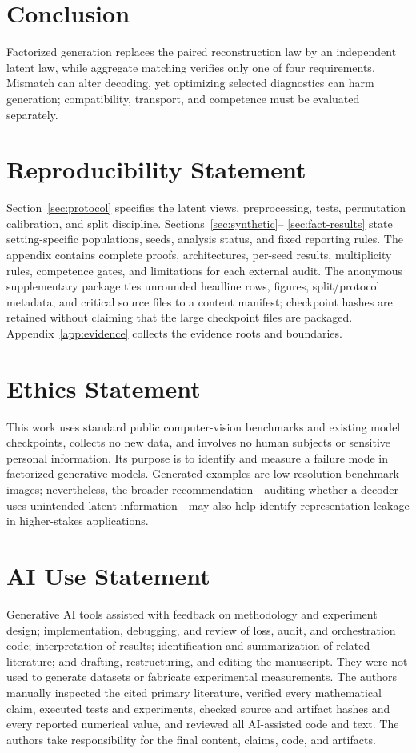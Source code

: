 \documentclass{article}
\begin{document}
\section{Conclusion}
Factorized generation replaces the paired reconstruction law by an independent
latent law, while aggregate matching verifies only one of four requirements.
Mismatch can alter decoding, yet optimizing selected diagnostics can harm
generation; compatibility, transport, and competence must be evaluated separately.

\clearpage
\section*{Reproducibility Statement}

Section~\ref{sec:protocol} specifies the latent views, preprocessing, tests,
permutation calibration, and split discipline.  Sections~\ref{sec:synthetic}--
\ref{sec:fact-results} state setting-specific populations, seeds, analysis
status, and fixed reporting rules.  The appendix contains complete proofs,
architectures, per-seed results, multiplicity rules, competence gates, and
limitations for each external audit.  The anonymous supplementary package ties
unrounded headline rows, figures, split/protocol metadata, and critical source
files to a content manifest; checkpoint hashes are retained without claiming
that the large checkpoint files are packaged.  Appendix~\ref{app:evidence}
collects the evidence roots and boundaries.

\section*{Ethics Statement}

This work uses standard public computer-vision benchmarks and existing model
checkpoints, collects no new data, and involves no human subjects or sensitive
personal information.  Its purpose is to identify and measure a failure mode
in factorized generative models.  Generated examples are low-resolution
benchmark images; nevertheless, the broader recommendation---auditing whether
a decoder uses unintended latent information---may also help identify
representation leakage in higher-stakes applications.

\section*{AI Use Statement}

Generative AI tools assisted with feedback on methodology and experiment
design; implementation, debugging, and review of loss, audit, and orchestration
code; interpretation of results; identification and summarization of related
literature; and drafting, restructuring, and editing the manuscript.  They
were not used to generate datasets or fabricate experimental measurements.
The authors manually inspected the cited primary literature, verified every
mathematical claim, executed tests and experiments, checked source and artifact
hashes and every reported numerical value, and reviewed all AI-assisted code
and text.  The authors take responsibility for the final content, claims,
code, and artifacts.

\clearpage



\appendix

\end{document}
